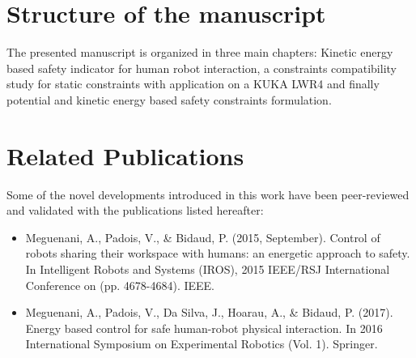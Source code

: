\section{Structure of the manuscript}
The presented manuscript is organized in three main chapters: Kinetic energy based safety indicator for human robot interaction, a constraints compatibility study for static constraints with application on a KUKA LWR4 and finally potential and kinetic energy based safety constraints formulation. 
\section{Related Publications}
Some of the novel developments introduced in this work have been peer-reviewed and validated with the publications listed hereafter:
\begin{itemize}
\item Meguenani, A., Padois, V., \& Bidaud, P. (2015, September). Control of robots sharing their workspace with humans: an energetic approach to safety. In Intelligent Robots and Systems (IROS), 2015 IEEE/RSJ International Conference on (pp. 4678-4684). IEEE.
\item Meguenani, A., Padois, V., Da Silva, J., Hoarau, A., \& Bidaud, P. (2017). Energy based control for safe human-robot physical interaction. In 2016 International Symposium on Experimental Robotics (Vol. 1). Springer.
\end{itemize}


